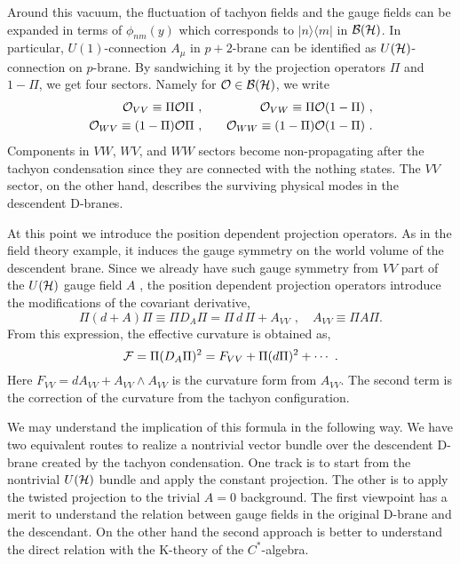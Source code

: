 \documentclass[a4paper,12pt]{article}
\begin{document}
Around this vacuum, the fluctuation of
tachyon fields and the gauge fields can be expanded
in terms of $\phi_{nm}(y)$ which corresponds to
$|n\rangle \langle m|$ in ${\cal B}({\cal H})$.
In particular, $U(1)$-connection $A_\mu$ in $p+2$-brane
can be identified as $U({\cal H})$-connection on $p$-brane.
By sandwiching it by the projection operators
$\Pi$ and $1-\Pi$, we get four sectors.
Namely for ${\cal O}\in {\cal B}({\cal H})$, we write
\begin{eqnarray}
{\cal O}_{VV}\equiv \Pi{\cal O}\Pi\,\,, &\quad&
{\cal O}_{VW}\equiv \Pi{\cal O}(1-\Pi)\,\,,\nonumber\\
{\cal O}_{WV}\equiv (1-\Pi){\cal O}\Pi\,\,,&\quad&
{\cal O}_{WW}\equiv (1-\Pi){\cal O}(1-\Pi)\,\,.
\end{eqnarray}
Components in $VW$, $WV$, and $WW$ sectors become non-propagating
after the tachyon condensation since they are connected
with the nothing states. 
The $VV$ sector, on the other hand, describes the surviving
physical modes in the descendent D-branes.

At this point we introduce the position dependent projection operators.
As in the field theory example, it induces the
gauge symmetry on the world volume of the descendent brane.
Since we already have such gauge symmetry from $VV$ part
of the $U({\cal H})$ gauge field $A$ \cite{r:Chicago}, the position
dependent projection operators introduce the 
modifications of the covariant derivative,
\begin{equation}
 \Pi (d+A) \Pi \equiv \Pi D_A \Pi= \Pi\,d\,\Pi + A_{VV}\,\,,
\quad
A_{VV}\equiv \Pi A \Pi.
\end{equation}
{}From this expression, the effective curvature is obtained as,
\begin{equation}\label{modified}
 {\cal F} = \Pi (D_A \Pi)^2=F_{VV} + \Pi(d\Pi)^2+\cdots\,\,.
\end{equation}
Here $F_{VV}=dA_{VV}+A_{VV}\wedge A_{VV}$ is the curvature form
from $A_{VV}$. 
The second term is the correction of the curvature
from the tachyon configuration.

We may understand the implication of this formula
in the following way. We have two equivalent routes
to realize a nontrivial vector bundle over the 
descendent D-brane created by the tachyon condensation.  
One track is to start
from the nontrivial $U({\cal H})$ bundle and apply the constant projection.
The other is to apply the twisted projection to the trivial 
$A=0$ background.
The first viewpoint has a merit to understand
the relation between gauge fields in the original
D-brane and the descendant.
On the other hand the second approach is better
to understand the direct relation with the 
K-theory of the $C^*$-algebra.
\end{document}
